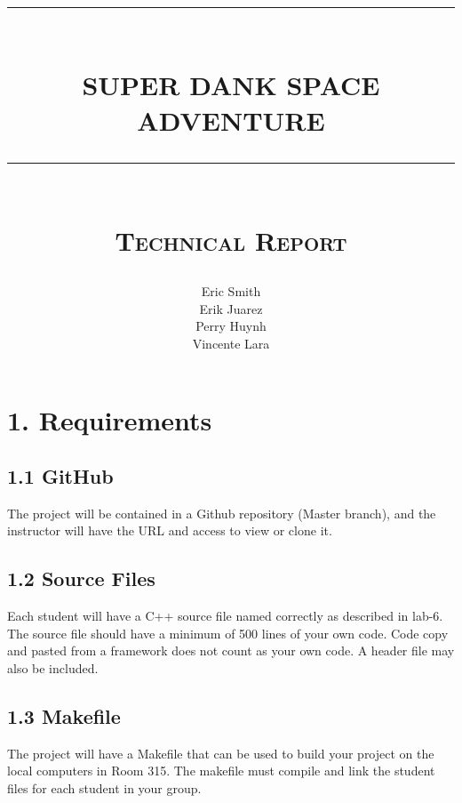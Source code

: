 \documentclass[12pt]{report}
\newcommand{\HRule}[1]{\rule{\linewidth}{#1}}
\begin{document}
\title{
        \HRule{0.5pt} \\ [0.5cm]
        \LARGE \textbf{\uppercase{Super Dank Space Adventure}}
        \HRule{0.5pt} \\ [0.5cm]
        \normalsize \textsc{Technical Report} \\}

\date{}

\author{Eric Smith \\
        Erik Juarez \\
        Perry Huynh \\
        Vincente Lara}

\maketitle
\tableofcontents


\sectionfont{\scshape}

\newpage
\section*{1. Requirements}

\subsection*{1.1 GitHub}
The project will be contained in a Github repository (Master branch), and the instructor will have the URL and access to view or clone it.

\subsection*{1.2 Source Files}
Each student will have a C++ source file named correctly as described in lab-6. The source file should have a minimum of 500 lines of your own code. Code copy and pasted from a framework does not count as your own code. A header file may also be included.

\subsection*{1.3 Makefile}
The project will have a Makefile that can be used to build your project on the local computers in Room 315. The makefile must compile and link the student files for each student in your group.
\end{document}
